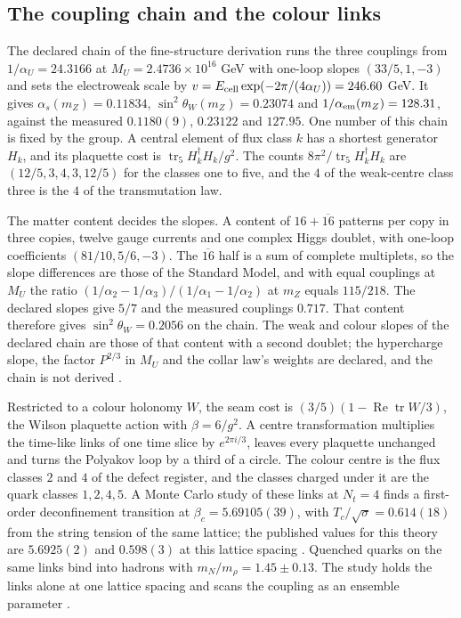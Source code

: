 \documentclass[11pt]{article}
\begin{document}
\subsection{The coupling chain and the colour links}
\label{sec:chain-and-colour}

The declared chain of the fine-structure derivation runs the three couplings from
\(1/\alpha_U=24.3166\) at \(M_U=2.4736\times10^{16}\) GeV with one-loop slopes
\((33/5,1,-3)\) and sets the electroweak scale by
\(v=E_{\rm cell}\exp(-2\pi/(4\alpha_U))=246.60\) GeV. It gives
\(\alpha_s(m_Z)=0.11834\), \(\sin^2\theta_W(m_Z)=0.23074\) and
\(1/\alpha_{\rm em}(m_Z)=128.31\), against the measured \(0.1180(9)\), \(0.23122\) and
\(127.95\). One number of this chain is fixed by the group. A central element of flux class
\(k\) has a shortest generator \(H_k\), and its plaquette cost is
\(\operatorname{tr}_5H_k^\dagger H_k/g^2\). The counts \(8\pi^2/\operatorname{tr}_5H_k^\dagger H_k\)
are \((12/5,3,4,3,12/5)\) for the classes one to five, and the \(4\) of the weak-centre class
three is the \(4\) of the transmutation law.

The matter content decides the slopes. A content of \(16+\overline{16}\)
patterns per copy in three copies, twelve gauge currents and one complex Higgs doublet, with
one-loop coefficients \((81/10,5/6,-3)\). The \(\overline{16}\) half is a sum of complete
multiplets, so the slope differences are those of the Standard Model, and with equal
couplings at \(M_U\) the ratio \((1/\alpha_2-1/\alpha_3)/(1/\alpha_1-1/\alpha_2)\) at
\(m_Z\) equals \(115/218\). The declared slopes give \(5/7\) and the measured couplings
\(0.717\). That content therefore gives \(\sin^2\theta_W=0.2056\) on the chain. The
weak and colour slopes of the declared chain are those of that content with a second
doublet; the hypercharge slope, the factor \(P^{2/3}\) in \(M_U\) and the collar law's weights
are declared, and the chain is not derived \cite{ophalpha,ophparticles}.

Restricted to a colour holonomy \(W\), the seam cost is
\((3/5)(1-\operatorname{Re}\operatorname{tr}W/3)\), the Wilson plaquette action with
\(\beta=6/g^2\). A centre transformation multiplies the time-like links of one time slice
by \(e^{2\pi i/3}\), leaves every plaquette unchanged and turns the Polyakov loop by a third
of a circle. The colour centre is the flux classes \(2\) and \(4\) of the defect register,
and the classes charged under it are the quark classes \(1,2,4,5\). A Monte Carlo study of
these links at \(N_t=4\) finds a first-order deconfinement transition at
\(\beta_c=5.69105(39)\), with \(T_c/\sqrt\sigma=0.614(18)\) from the string tension of the
same lattice; the published values for this theory are \(5.6925(2)\) and \(0.598(3)\) at this
lattice spacing \cite{boyd1996thermodynamics}. Quenched quarks on the same links bind into
hadrons with \(m_N/m_\rho=1.45\pm0.13\). The study holds the links alone at one lattice
spacing and scans the coupling as an ensemble parameter \cite{ophparticles,ophrepo}.
\end{document}
